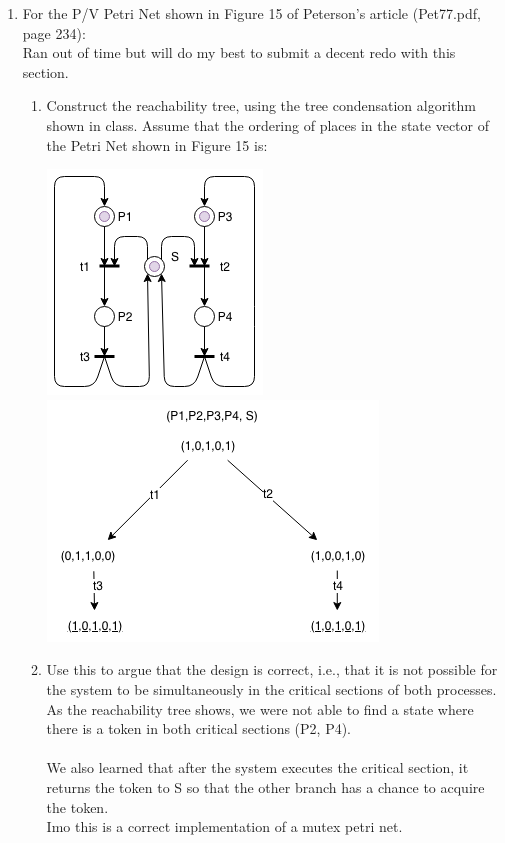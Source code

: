 \documentclass{article}
\begin{document}
\begin{enumerate}
\item For the P/V Petri Net shown in Figure 15 of Peterson's article
(Pet77.pdf, page 234):
\\ Ran out of time but will do my best to submit a decent redo with this section.
\begin{enumerate}
 \item  Construct the reachability tree, using the tree condensation
   algorithm shown in class. Assume that the ordering of places in the state vector of the Petri Net shown in Figure 15 is:
 \begin{center}
        \includegraphics[scale=0.5]{HW13P3graph.png} \\
        \includegraphics[scale=0.5]{PetriHW13P3.png} \\
 \end{center}
 \item Use this to argue that the design is correct, i.e., that it is
       not possible for the system to be simultaneously in the
       critical sections of both processes. \\
       As the reachability tree shows, we were not able to find a state where there is a token in both critical sections (P2, P4). \\
       \\
       We also learned that after the system executes the critical section, it returns the token to S so that the other branch has a chance to acquire the token. \\
       Imo this is a correct implementation of a mutex petri net.\\
\end{enumerate}

\end{enumerate}
\end{document}
